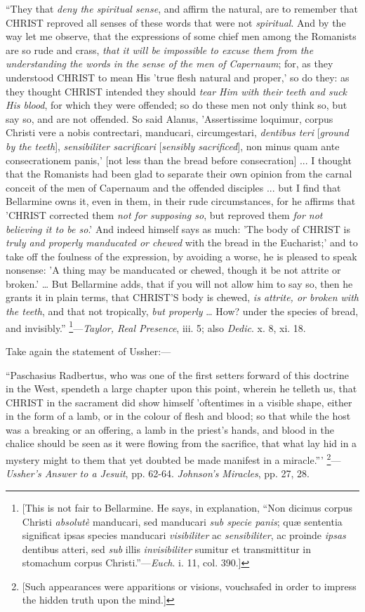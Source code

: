 ``They that \emph{deny the spiritual sense}, and
affirm the natural, are to remember that CHRIST
reproved all senses of these words that were not \emph{spiritual}. And
by the way let me observe, that the expressions of some chief men
among the Romanists are so rude and crass, \emph{that it will be
impossible to excuse them from the understanding the words in the
sense of the men of Capernaum}; for, as they understood CHRIST
to mean His 'true flesh natural and proper,' so do they: as they
thought CHRIST intended
they should \emph{tear Him with their teeth and suck His blood}, for
which they were offended; so do these men not only think so, but say
so, and are not offended. So said Alanus, 'Assertissime loquimur,
corpus Christi vere a nobis contrectari, manducari, circumgestari, \emph{dentibus
teri} [\emph{ground by the teeth}], \emph{sensibiliter sacrificari}
[\emph{sensibly sacrificed}], non minus quam ante consecrationem panis,'
[not less than the bread before consecration] ... I thought that the
Romanists had been glad to separate their own opinion from the carnal
conceit of the men of Capernaum and the offended disciples ... but I
find that Bellarmine owns it, even in them, in their rude
circumstances, for he affirms that 'CHRIST
corrected them \emph{not for supposing so}, but reproved them \emph{for
not believing it to be so}.' And indeed himself says as much: 'The
body of CHRIST is \emph{truly
and properly manducated or chewed} with the bread in the
Eucharist;' and to take off the foulness of the expression, by
avoiding a worse, he is pleased to speak nonsense: 'A thing may be
manducated or chewed, though it be not attrite or broken.' … But
Bellarmine adds, that if you will not allow him to say so, then he
grants it in plain terms, that CHRIST'S
body is chewed, \emph{is attrite, or broken with the teeth}, and that
not tropically, \emph{but properly} … How? under the species of
bread, and invisibly.'' \footnote{[This is not fair to Bellarmine. He says, in explanation,
``Non dicimus corpus Christi \emph{absolutè} manducari, sed
manducari \emph{sub specie panis}; quæ sententia significat ipsas
species manducari \emph{visibiliter} ac \emph{sensibiliter}, ac
proinde \emph{ipsas} dentibus atteri, sed \emph{sub} illis \emph{invisibiliter}
sumitur et transmittitur in stomachum corpus Christi.''—\emph{Euch}. i.
11, col. 390.]}—\emph{Taylor,
Real Presence}, iii. 5; also \emph{Dedic}. x. 8, xi. 18.

Take again the statement of Ussher:—

``Paschasius Radbertus, who was one of the first
setters forward of this doctrine in the West, spendeth a large chapter
upon this point, wherein he telleth us, that CHRIST
in the sacrament did show himself 'oftentimes in a visible shape,
either in the form of a lamb, or in the colour of flesh and blood; so
that while the host was a breaking or an offering, a lamb in the
priest's hands, and blood in the chalice should be seen as it were
flowing from the sacrifice, that what lay hid in a mystery might to
them that yet doubted be made manifest in a miracle.''' \footnote{[Such appearances were apparitions or
visions, vouchsafed in order to impress the hidden truth upon the
mind.]}—\emph{Ussher's Answer to a Jesuit}, pp. 62-64. \emph{Johnson's
Miracles}, pp. 27, 28.

